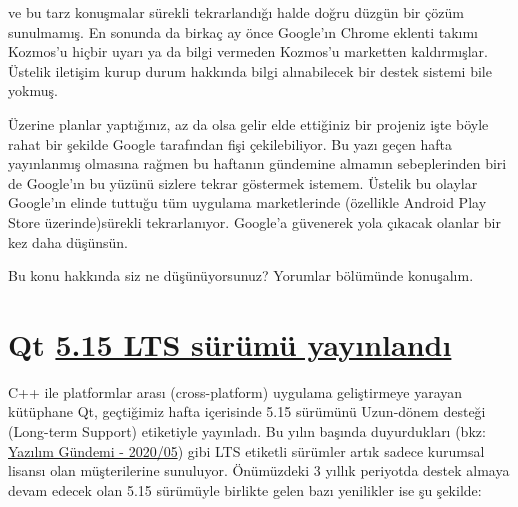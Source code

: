 \documentclass[11pt]{article}
\begin{document}
ve bu tarz konuşmalar sürekli tekrarlandığı halde doğru düzgün bir çözüm
sunulmamış. En sonunda da birkaç ay önce Google'ın Chrome eklenti takımı
Kozmos'u hiçbir uyarı ya da bilgi vermeden Kozmos'u marketten kaldırmışlar.
Üstelik iletişim kurup durum hakkında bilgi alınabilecek bir destek sistemi
bile yokmuş.

Üzerine planlar yaptığınız, az da olsa gelir elde ettiğiniz bir projeniz işte
böyle rahat bir şekilde Google tarafından fişi çekilebiliyor. Bu yazı geçen
hafta yayınlanmış olmasına rağmen bu haftanın gündemine almamın sebeplerinden
biri de Google'ın bu yüzünü sizlere tekrar göstermek istemem. Üstelik bu
olaylar Google'ın elinde tuttuğu tüm uygulama marketlerinde (özellikle Android
Play Store üzerinde)sürekli tekrarlanıyor. Google'a güvenerek yola çıkacak
olanlar bir kez daha düşünsün.

Bu konu hakkında siz ne düşünüyorsunuz? Yorumlar bölümünde konuşalım.
\section{Qt \href{https://www.qt.io/blog/qt-5.15-released}{5.15 LTS sürümü yayınlandı}}
\label{sec:org9e3735f}
C++ ile platformlar arası (cross-platform) uygulama geliştirmeye yarayan
kütüphane Qt, geçtiğimiz hafta içerisinde 5.15 sürümünü Uzun-dönem desteği
(Long-term Support) etiketiyle yayınladı. Bu yılın başında duyurdukları (bkz:
\href{../05/yazilim-gundemi-2020-05.pdf}{Yazılım Gündemi - 2020/05}) gibi LTS etiketli sürümler artık sadece kurumsal
lisansı olan müşterilerine sunuluyor. Önümüzdeki 3 yıllık periyotda destek
almaya devam edecek olan 5.15 sürümüyle birlikte gelen bazı yenilikler ise şu
şekilde:
\end{document}
